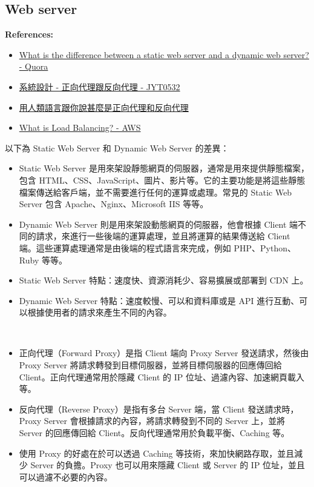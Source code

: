 \documentclass[12pt]{article}
\newenvironment{problem}[2][Problem]{\begin{trivlist}
\item[\hskip \labelsep {\bfseries #1}\hskip \labelsep {\bfseries #2}]}{\end{trivlist}}
\newenvironment{mycolorbox}[1][gray]{
  \renewmdenv[
    linewidth=2pt, linecolor=#1, backgroundcolor=#1!10,
    topline=false, bottomline=false, rightline=false,
    skipabove=10pt, skipbelow=10pt, innerleftmargin=10pt,
    innerrightmargin=0pt, innertopmargin=5pt, innerbottommargin=5pt
  ]{myquote}
  \begin{myquote}
}{\end{myquote}}
\begin{document}
\subsection{Web server}
\begin{mycolorbox}[teal]
  \textbf{References:}
  \footnotesize
  \begin{itemize}
    \item \href{https://www.quora.com/What-is-the-difference-between-a-static-web-server-and-a-dynamic-web-server}{What is the difference between a static web server and a dynamic web server? - Quora}
    \item \href{https://www.jyt0532.com/2019/11/18/proxy-reverse-proxy/}{系統設計 - 正向代理跟反向代理 - JYT0532}
    \item \href{https://www.pressplay.cc/project/F720CEB1D6057D7ABB5614722AB18FFF/articles/660A57208C29FF94453548ED21F284EF}{用人類語言跟你說甚麼是正向代理和反向代理}
    \item \href{https://aws.amazon.com/what-is/load-balancing/}{What is Load Balancing? - AWS}
  \end{itemize}
\end{mycolorbox}
\begin{problem}{1.1 (a)}
  以下為 Static Web Server 和 Dynamic Web Server 的差異：
  \begin{itemize}
    \item Static Web Server 是用來架設靜態網頁的伺服器，通常是用來提供靜態檔案，包含 HTML、CSS、JavaScript、圖片、影片等。它的主要功能是將這些靜態檔案傳送給客戶端，並不需要進行任何的運算或處理。常見的 Static Web Server 包含 Apache、Nginx、Microsoft IIS 等等。
    \item Dynamic Web Server 則是用來架設動態網頁的伺服器，他會根據 Client 端不同的請求，來進行一些後端的運算處理，並且將運算的結果傳送給 Client 端。這些運算處理通常是由後端的程式語言來完成，例如 PHP、Python、Ruby 等等。
    \item Static Web Server 特點：速度快、資源消耗少、容易擴展或部署到 CDN 上。
    \item Dynamic Web Server 特點：速度較慢、可以和資料庫或是 API 進行互動、可以根據使用者的請求來產生不同的內容。
  \end{itemize}
\end{problem}

\begin{problem}{1.1 (b)} 　
\begin{itemize}
  \item 正向代理（Forward Proxy）是指 Client 端向 Proxy Server 發送請求，然後由Proxy Server 將請求轉發到目標伺服器，並將目標伺服器的回應傳回給 Client。正向代理通常用於隱藏 Client 的 IP 位址、過濾內容、加速網頁載入等。
  \item 反向代理（Reverse Proxy）是指有多台 Server 端，當 Client 發送請求時，Proxy Server 會根據請求的內容，將請求轉發到不同的 Server 上，並將 Server 的回應傳回給 Client。反向代理通常用於負載平衡、Caching 等。
  \item 使用 Proxy 的好處在於可以透過 Caching 等技術，來加快網路存取，並且減少 Server 的負擔。Proxy 也可以用來隱藏 Client 或 Server 的 IP 位址，並且可以過濾不必要的內容。
\end{itemize}
\end{problem}
\end{document}

